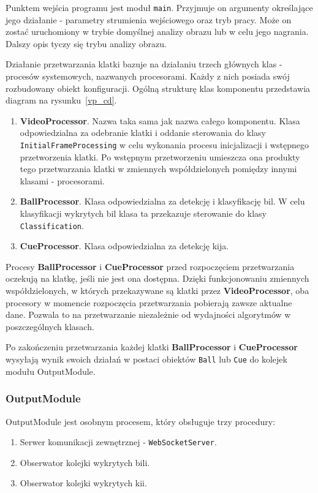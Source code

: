\documentclass[12pt]{article}
\begin{document}
Punktem wejścia programu jest moduł \lstinline{main}. Przyjmuje on argumenty określające jego działanie - parametry strumienia wejściowego oraz tryb pracy. Może on zostać uruchomiony w trybie domyślnej analizy obrazu lub w celu jego nagrania. Dalszy opis tyczy się trybu analizy obrazu.

Działanie przetwarzania klatki bazuje na działaniu trzech głównych klas - procesów systemowych, nazwanych procesorami. Każdy z nich posiada swój rozbudowany obiekt konfiguracji. Ogólną strukturę klas komponentu przedstawia diagram na rysunku~\ref{vp_cd}.

\begin{enumerate}
    \item \textbf{VideoProcessor}. Nazwa taka sama jak nazwa całego komponentu. Klasa odpowiedzialna za odebranie klatki i oddanie sterowania do klasy \lstinline{InitialFrameProcessing} w celu wykonania procesu inicjalizacji i wstępnego przetworzenia klatki. Po wstępnym przetworzeniu umieszcza ona produkty tego przetwarzania klatki w zmiennych współdzielonych pomiędzy innymi klasami - procesorami.
    \item \textbf{BallProcessor}. Klasa odpowiedzialna za detekcję i klasyfikację bil. W celu klasyfikacji wykrytych bil klasa ta przekazuje sterowanie do klasy \lstinline{Classification}.
    \item \textbf{CueProcessor}. Klasa odpowiedzialna za detekcję kija. %
\end{enumerate}

Procesy \textbf{BallProcessor} i \textbf{CueProcessor} przed rozpoczęciem przetwarzania oczekują na klatkę, jeśli nie jest ona dostępna. Dzięki funkcjonowaniu zmiennych współdzielonych, w których przekazywane są klatki przez \textbf{VideoProcessor}, oba procesory w momencie rozpoczęcia przetwarzania pobierają zawsze aktualne dane. Pozwala to na przetwarzanie niezależnie od wydajności algorytmów w poszczególnych klasach.

Po zakończeniu przetwarzania każdej klatki \textbf{BallProcessor} i \textbf{CueProcessor} wysyłają wynik swoich działań w postaci obiektów \lstinline{Ball} lub \lstinline{Cue} do kolejek modułu OutputModule.

\subsubsection{OutputModule}

OutputModule jest osobnym procesem, który obsługuje trzy procedury:
\begin{enumerate} [noitemsep]
    \item Serwer komunikacji zewnętrznej - \lstinline{WebSocketServer}.
    \item Obserwator kolejki wykrytych bili.
    \item Obserwator kolejki wykrytych kii.
\end{enumerate}
\end{document}
